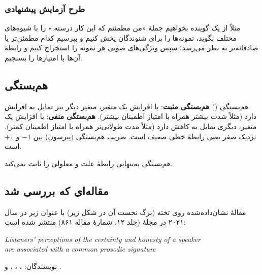 \subsubsection{طرح آزمایش پیشنهادی}
\begin{center}
\end{center}

مثلاً از یک گوینده بخواهیم جملهٔ «من مطمئنم که این کار درسته.» را با شیوه‌های مختلف بگوید، نمونه‌ها را برای شنوندگان پخش کنیم و بپرسیم کدام مطمئن‌تر یا صادقانه‌تر به نظر می‌رسد؛ سپس ویژگی‌های صوتی هر نمونه را استخراج کنیم و رابطهٔ آن‌ها با امتیازها را بسنجیم.

\subsection{هم‌بستگی}
\begin{definitionbox}{هم‌بستگی ()}
\textbf{هم‌بستگی مثبت}: با افزایش یک متغیر، متغیر دیگر نیز تمایل به افزایش دارد (مثلاً شدت بیشتر همراه با امتیاز اطمینان بیشتر). \textbf{هم‌بستگی منفی}: با افزایش یک متغیر، دیگری تمایل به کاهش دارد (مثلاً مدت طولانی‌تر همراه با امتیاز اطمینان کمتر). نزدیک صفر یعنی رابطهٔ خطی ضعیف است. ضریب هم‌بستگی (پیرسون) بین $-1$ و $+1$ است.
\end{definitionbox}
هم‌بستگی به‌تنهایی رابطهٔ علت و معلولی را ثابت نمی‌کند.

\subsection{مقاله‌ای که بررسی شد}
مقالهٔ نشان‌داده‌شده روی تخته (برگ نخست آن در شکل زیر) با عنوان زیر در سال ۲۰۲۱ در مجلهٔ  (جلد ۱۲، شمارهٔ مقاله ۸۶۱) منتشر شده است:
\begin{center}
\begin{latin}
\textit{Listeners' perceptions of the certainty and honesty of a speaker\\ are associated with a common prosodic signature}
\end{latin}
\end{center}
نویسندگان: ، ، ،  و .

